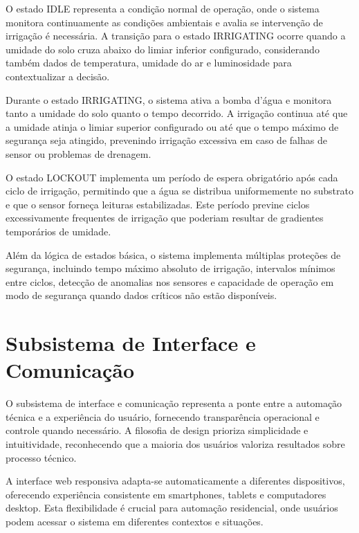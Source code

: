 O estado IDLE representa a condição normal de operação, onde o sistema monitora continuamente as condições ambientais e avalia se intervenção de irrigação é necessária. A transição para o estado IRRIGATING ocorre quando a umidade do solo cruza abaixo do limiar inferior configurado, considerando também dados de temperatura, umidade do ar e luminosidade para contextualizar a decisão.

Durante o estado IRRIGATING, o sistema ativa a bomba d'água e monitora tanto a umidade do solo quanto o tempo decorrido. A irrigação continua até que a umidade atinja o limiar superior configurado ou até que o tempo máximo de segurança seja atingido, prevenindo irrigação excessiva em caso de falhas de sensor ou problemas de drenagem.

O estado LOCKOUT implementa um período de espera obrigatório após cada ciclo de irrigação, permitindo que a água se distribua uniformemente no substrato e que o sensor forneça leituras estabilizadas. Este período previne ciclos excessivamente frequentes de irrigação que poderiam resultar de gradientes temporários de umidade.

Além da lógica de estados básica, o sistema implementa múltiplas proteções de segurança, incluindo tempo máximo absoluto de irrigação, intervalos mínimos entre ciclos, detecção de anomalias nos sensores e capacidade de operação em modo de segurança quando dados críticos não estão disponíveis.


\section{Subsistema de Interface e Comunicação}

O subsistema de interface e comunicação representa a ponte entre a automação técnica e a experiência do usuário, fornecendo transparência operacional e controle quando necessário. A filosofia de design prioriza simplicidade e intuitividade, reconhecendo que a maioria dos usuários valoriza resultados sobre processo técnico.

A interface web responsiva adapta-se automaticamente a diferentes dispositivos, oferecendo experiência consistente em smartphones, tablets e computadores desktop. Esta flexibilidade é crucial para automação residencial, onde usuários podem acessar o sistema em diferentes contextos e situações.


